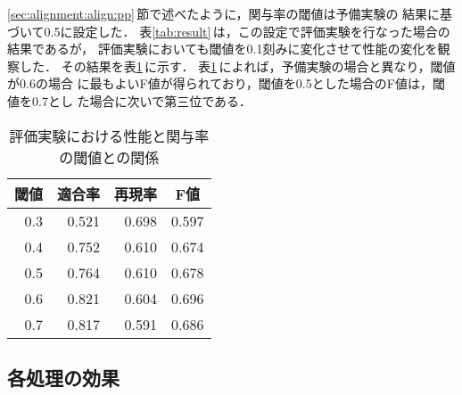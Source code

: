\ref{sec:alignment:align:pp}\,節で述べたように，関与率の閾値は予備実験の
結果に基づいて0.5に設定した．
表\ref{tab:result}\,は，この設定で評価実験を行なった場合の結果であるが，
評価実験においても閾値を0.1刻みに変化させて性能の変化を観察した．
その結果を表\ref{tab:threshold}\,に示す．
表\ref{tab:threshold}\,によれば，予備実験の場合と異なり，閾値が0.6の場合
に最もよいF値が得られており，閾値を0.5とした場合のF値は，閾値を0.7とし
た場合に次いで第三位である．
\begin{table}[htbp]
\caption{評価実験における性能と関与率の閾値との関係}
\label{tab:threshold}
\begin{center}
\begin{tabular}{|r||r|r|r|}\hline
\multicolumn{1}{|c||}{閾値} & \multicolumn{1}{c|}{適合率} & 
\multicolumn{1}{c|}{再現率} & \multicolumn{1}{c|}{F値} \\\hline\hline
0.3 & 0.521 & 0.698 & 0.597 \\
0.4 & 0.752 & 0.610 & 0.674 \\
0.5 & 0.764 & 0.610 & 0.678 \\
0.6 & 0.821 & 0.604 & 0.696 \\
0.7 & 0.817 & 0.591 & 0.686 \\\hline
\end{tabular}
\end{center}
\end{table}


\subsection{各処理の効果}
\label{sec:experiment:each}

